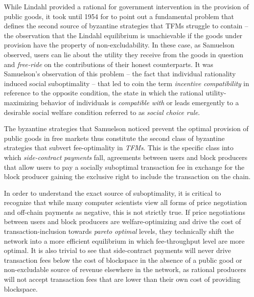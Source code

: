 \documentclass[sigconf,anonymous]{aamas}
\begin{document}
While Lindahl provided a rational for government intervention in the provision of public goods, it took until 1954 for \citet{samuelson1954pure} to point out a fundamental problem that defines the second source of byzantine strategies that TFMs struggle to contain -- the observation that the Lindahl equilibrium is unachievable if the goods under provision have the property of non-excludability. In these case, as Samuelson observed, users can lie about the utility they receive from the goods in question and \textit{free-ride} on the contributions of their honest counterparts. It was Samuelson's observation of this problem -- the fact that individual rationality induced social suboptimality -- that led \citet{hurwicz1960optimality} to coin the term \textit{incentive compatibility} in reference to the opposite condition, the state in which the rational utility-maximizing behavior of individuals is \textit{compatible with} or leads emergently to a desirable social welfare condition referred to as \textit{social choice rule}.

The byzantine strategies that Samuelson noticed prevent the optimal provision of public goods in free markets thus constitute the second class of byzantine strategies that subvert fee-optimality in \textit{TFMs}. This is the specific class into which \textit{side-contract payments} fall, agreements between users and block producers that allow users to pay a socially suboptimal transaction fee in exchange for the block producer gaining the exclusive right to include the transaction on the chain.

In order to understand the exact source of suboptimality, it is critical to recognize that while many computer scientists view all forms of price negotiation and off-chain payments as negative, this is not strictly true. If price negotiations between users and block producers are welfare-optimizing and drive the cost of transaction-inclusion towards \textit{pareto optimal} levels, they technically shift the network into a more efficient equilibrium in which fee-throughput level are more optimal. It is also trivial to see that side-contract payments will never drive transaction fees below the cost of blockspace in the absence of a public good or non-excludable source of revenue elsewhere in the network, as rational producers will not accept transaction fees that are lower than their own cost of providing blockspace.
\end{document}

